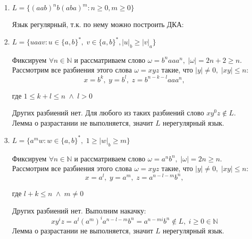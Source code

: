 \documentclass{article}
\begin{document}
\begin{enumerate}
    \item \(L=\{(aab)^{n}b(aba)^{m} : n \geqslant 0, m \geqslant 0\}\)
    
Язык регулярный, т.к. по нему можно построить ДКА:




    \item \(L = \{uaav : u \in \{a, b\}^*, \; v \in \{a, b\}^*, |u|_b \geqslant |v|_a\}\)
    
    Фиксируем \(\forall n \in \mathbb{N} \) и рассматриваем слово \(\omega = b^{n}aaa^{n}, \; |\omega| = 2n + 2 \geq n\). Рассмотрим все разбиения этого слова \(\omega = xyz\) такие, что \(|y| \neq 0, \; |xy| \leq n\):
    $$x = b^{k}, \; y = b^{l}, \; z = b^{n - k - l}aaa^n,$$ 
    
    \begin{center}
        где \(1 \leq k + l \leq n \; \wedge \; l > 0\)
    \end{center} 
    
    Других разбиений нет.
    Для любого из таких разбиений слово \(xy^0z \notin L\). Лемма о разрастании не выполняется, значит \(L\) нерегулярный язык.
    
    \item \(L = \{a^mw : w \in \{a, b\}^{*}, \; 1 \geqslant |w|_b \geqslant m\}\)
    
    
    Фиксируем \(\forall n \in \mathbb{N} \) и рассматриваем слово \(\omega = a^nb^n, \; |\omega| = 2n \geqslant n\). Рассмотрим все разбиения этого слова \(\omega = xyz\) такие, что \(|y| \neq 0, \; |xy| \leq n\):
    $$x = a^{l}, \; y = a^{m}, \; z = a^{n-l-m}b^{n},$$ 
    
    \begin{center}
        где \(l + k \leqslant n \; \wedge \; m \ne 0\)
    \end{center} 
    
    Других разбиений нет. Выполним накачку: 
    $$xy^{i}z = a^{l}(a^{m})^{i}a^{n-l-m}b^{n} = a^{n-mi}b^{n} \notin L, \; i 
    \geqslant 0 \in \mathbb{N} $$
    Лемма о разрастании не выполняется, значит \(L\) нерегулярный язык.
    

\end{enumerate}
\end{document}

